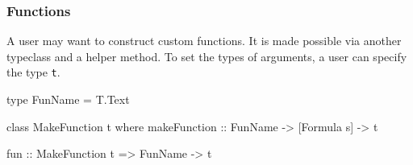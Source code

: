 \subsubsection{Functions}

A user may want to construct custom functions. It is made possible via another typeclass and a helper method. To set the types of arguments, a user can specify the type \texttt{t}.

\begin{mycode}
  type FunName = T.Text

  class MakeFunction t where
  makeFunction :: FunName -> [Formula s] -> t

  fun :: MakeFunction t => FunName -> t
\end{mycode}













